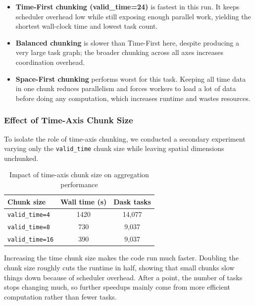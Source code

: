 \begin{itemize}
    \item \textbf{Time-First chunking (valid\_time=24)} is fastest in this run.
    It keeps scheduler overhead low while still exposing enough parallel work,
    yielding the shortest wall-clock time and lowest task count.

    \item \textbf{Balanced chunking} is slower than Time-First here, despite
    producing a very large task graph; the broader chunking across all axes
    increases coordination overhead.

    \item \textbf{Space-First chunking} performs worst for this task. Keeping
    all time data in one chunk reduces parallelism and forces workers to load a
    lot of data before doing any computation, which increases runtime and wastes
    resources.
\end{itemize}

\subsubsection{Effect of Time-Axis Chunk Size}
To isolate the role of time-axis chunking, we conducted a secondary experiment
varying only the \verb|valid_time| chunk size while leaving spatial dimensions
unchunked.

\begin{table}[h]
    \centering
    \small
    \setlength{\tabcolsep}{5pt}
    \renewcommand{\arraystretch}{1.1}
    \caption{Impact of time-axis chunk size on aggregation performance}
    \begin{tabular}{p{}cc}
        \hline
        Chunk size & Wall time (s) & Dask tasks \\
        \hline
        \verb|valid_time=4|  & 1420 & 14,077 \\
        \verb|valid_time=8|  & 730  & 9,037  \\
        \verb|valid_time=16| & 390  & 9,037  \\
        \hline
    \end{tabular}
\end{table}

Increasing the time chunk size makes the code run much faster. Doubling the
chunk size roughly cuts the runtime in half, showing that small chunks slow
things down because of scheduler overhead. After a point, the number of tasks
stops changing much, so further speedups mainly come from more efficient
computation rather than fewer tasks.

